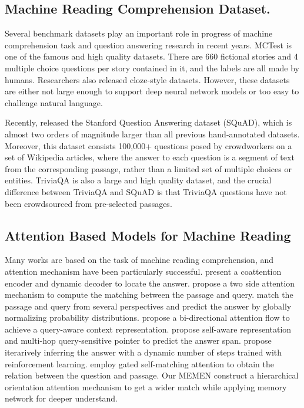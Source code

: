 \documentclass[letterpaper]{article}
\begin{document}
\subsection{Machine Reading Comprehension Dataset. }
Several benchmark datasets play an important role in progress of machine comprehension task and question answering research in recent years. MCTest\citep{richardson2013mctest} is one of the famous and high quality datasets. There are 660 fictional stories and 4 multiple choice questions per story contained in it, and the labels are all made by humans. Researchers also released cloze-style datasets\citep{hill2015goldilocks,hermann2015teaching,onishi2016did,paperno2016lambada}. However, these datasets are either not large enough to support deep neural network models or too easy to challenge natural language.

Recently, \citet{rajpurkar2016squad} released the Stanford Question Answering dataset (SQuAD), which is almost two orders of magnitude larger than all previous hand-annotated datasets. Moreover, this dataset consists 100,000+ questions posed by crowdworkers on a set of Wikipedia articles, where the answer to each question is a segment of text from the corresponding passage, rather than a limited set of multiple choices or entities. TriviaQA \citep{joshi2017triviaqa} is also a large and high quality dataset, and the crucial difference between TriviaQA and SQuAD is that TriviaQA questions have not been crowdsourced from pre-selected passages.

\subsection{Attention Based Models for Machine Reading}
Many works are based on the task of machine reading comprehension, and attention mechanism have been particularly successful\citep{xiong2016dynamic,cui2016attention,wang2016multi,seo2016bidirectional,hu2017mnemonic,shen2016reasonet,rnet}. \citet{xiong2016dynamic} present a coattention encoder and dynamic decoder to locate the answer. \citet{cui2016attention} propose a two side attention mechanism to compute the matching between the passage and query. \citet{wang2016multi} match the passage and query from several perspectives and predict the answer by globally normalizing probability distributions. \citet{seo2016bidirectional} propose a bi-directional attention flow to achieve a query-aware context representation.  \citet{hu2017mnemonic} propose self-aware representation and multi-hop query-sensitive pointer to predict the answer span. \citet{shen2016reasonet} propose iterarively inferring the answer with a dynamic number of steps trained with reinforcement learning. \citet{rnet} employ gated self-matching attention to obtain the relation between the question and passage. Our MEMEN construct a hierarchical orientation attention mechanism to get a wider match while applying memory network\citep{sukhbaatar2015end} for deeper understand.
\end{document}
